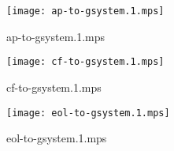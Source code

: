 \documentclass[letterpaper,10pt]{article}
\begin{document}
\begin{figure}
    \centering
    \texttt{[image: ap-to-gsystem.1.mps]}
    \caption{ap-to-gsystem.1.mps}
\end{figure}

\begin{figure}
    \centering
    \texttt{[image: cf-to-gsystem.1.mps]}
    \caption{cf-to-gsystem.1.mps}
\end{figure}

\begin{figure}
    \centering
    \texttt{[image: eol-to-gsystem.1.mps]}
    \caption{eol-to-gsystem.1.mps}
\end{figure}
\end{document}
